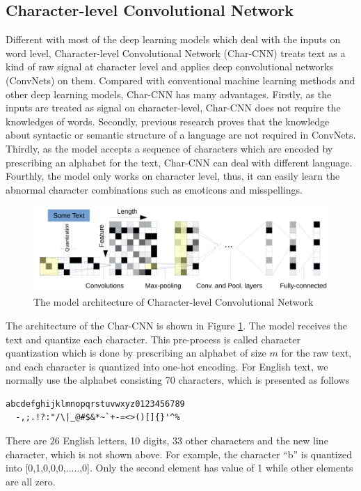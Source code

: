 \subsection{Character-level Convolutional Network}
\label{cnn_background}
Different with most of the deep learning models which deal with the inputs on word level, Character-level Convolutional Network (Char-CNN) treats text as a kind of raw signal at character level and applies deep convolutional networks (ConvNets) on them. Compared with conventional machine learning methods and other deep learning models, Char-CNN has many advantages. Firstly, as the inputs are treated as signal on character-level, 
Char-CNN does not require the knowledges of words. Secondly, previous research proves that the knowledge about syntactic or semantic structure of a language are not required in ConvNets. Thirdly, as the model accepts a sequence of characters which are encoded by prescribing an alphabet for the text, Char-CNN can deal with different language. Fourthly, the model only works on character level, thus, it can easily learn the abnormal character combinations such as emoticons and misspellings.

\begin{figure}
\centering
\caption{The model architecture of Character-level Convolutional Network~\cite{zhang2015character}}
\label{char_cnn}
\includegraphics{char_cnn.png}
\end{figure}

The architecture of the Char-CNN is shown in Figure \ref{char_cnn}. The model receives the text and quantize each character. This pre-process is called character quantization which is done by prescribing an alphabet of size $m$ for the raw text, and each character is quantized into one-hot encoding. For English text, we normally use the alphabet consisting 70 characters, which is presented as follows
\begin{lstlisting}[language=Tex,basicstyle = \ttfamily, breaklines = true]
  abcdefghijklmnopqrstuvwxyz0123456789
  -,;.!?:"/\|_@#$&*~`+-=<>()[]{}'^%
\end{lstlisting}
There are 26 English letters, 10 digits, 33 other characters and the new line character, which is not shown above. For example, the character ``b'' is quantized into [0,1,0,0,0,.....,0]. Only the second element has value of 1 while other elements are all zero. 

